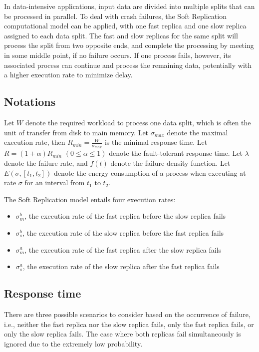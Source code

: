 
In data-intensive applications, input data are divided into multiple splits that can be processed in parallel. To deal with crash failures, the Soft Replication computational model can be applied, with one fast replica and one slow replica assigned to each data split. The fast and slow replicas for the same split will process the split from two opposite ends, and complete the processing by meeting in some middle point, if no failure occurs. If one process fails, however, its associated process can continue and process the remaining data, potentially with a higher execution rate to minimize delay.

\subsection{Notations}
Let $W$ denote the required workload to process one data split, which is often the unit of transfer from disk to main memory. Let $\sigma_{max}$ denote the maximal execution rate, then $R_{min}=\frac{W}{\sigma_{max}}$ is the minimal response time. Let $\overline{R}=(1+\alpha)R_{min}$ $(0\leq \alpha \leq 1)$ denote the fault-tolerant response time. Let $\lambda$ denote the failure rate, and $f(t)$ denote the failure density function. Let $E(\sigma, [t_1, t_2])$ denote the energy consumption of a process when executing at rate $\sigma$ for an interval from $t_1$ to $t_2$.

The Soft Replication model entails four execution rates:
\begin{itemize}
	\item $\sigma_{m}^{b}$, the execution rate of the fast replica before the slow replica fails
    \item $\sigma_{s}^{b}$, the execution rate of the slow replica before the fast replica fails
    \item $\sigma_{m}^{a}$, the execution rate of the fast replica after the slow replica fails
    \item $\sigma_{s}^{a}$, the execution rate of the slow replica after the fast replica fails
\end{itemize}

\subsection{Response time}
\label{sec:res_time}
There are three possible scenarios to consider based on the occurrence of failure, i.e., neither the fast replica nor the slow replica fails, only the fast replica fails, or only the slow replica fails.  The  case where both  replicas fail simultaneously is ignored due to the extremely low probability.

